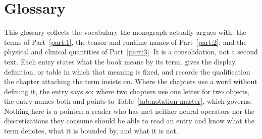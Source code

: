\chapter{Glossary}\label{app:glossary}

This glossary collects the vocabulary the monograph actually argues with: the
terms of Part~\ref{part:1}, the tensor and runtime names of Part~\ref{part:2}, and
the physical and clinical quantities of Part~\ref{part:3}. It is a consolidation,
not a second text. Each entry states what the book means by its term, gives the
display, definition, or table in which that meaning is fixed, and records the
qualification the chapter attaching the term insists on. Where the chapters use a
word without defining it, the entry says so; where two chapters use one letter for
two objects, the entry names both and points to Table~\ref{tab:notation-master},
which governs. Nothing here is a pointer: a reader who has met neither neural
operators nor the discretizations they consume should be able to read an entry
and know what the term denotes, what it is bounded by, and what it is not.

